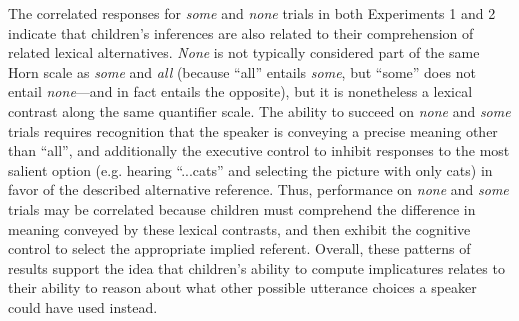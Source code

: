 \documentclass[10pt,letterpaper]{article}
\begin{document}
The correlated responses for \emph{some} and \emph{none} trials in both Experiments 1 and 2 indicate that children's inferences are also related to their comprehension of related lexical alternatives. \emph{None} is not typically considered part of the same Horn scale as \emph{some} and \emph{all} (because ``all'' entails \emph{some}, but ``some'' does not entail \emph{none}---and in fact entails the opposite), but it is nonetheless a lexical contrast along the same quantifier scale. 
The ability to succeed on \emph{none} and \emph{some} trials requires recognition that the speaker is conveying a precise meaning other than ``all'', and additionally the executive control to inhibit responses to the most salient option (e.g. hearing ``...cats'' and selecting the picture with only cats) in favor of the described alternative reference.  Thus, performance on \emph{none} and \emph{some} trials may be correlated because children must comprehend the difference in meaning conveyed by these lexical contrasts, and then exhibit the cognitive control to select the appropriate implied referent. 
Overall, these patterns of results support the idea that children's ability to compute implicatures relates to their ability to reason about what other possible utterance choices a speaker could have used instead.  


\end{document}
